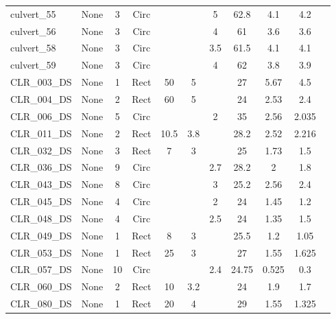 \begin{table}[]
\begin{tabular}{@{}lcccccccccc@{}}
culvert\_55   & None       & 3        & Circ &        &       & 5        & 62.8   & 4.1       & 4.2        \\
culvert\_56   & None       & 3        & Circ &        &       & 4        & 61     & 3.6       & 3.6        \\
culvert\_58   & None       & 3        & Circ &        &       & 3.5      & 61.5   & 4.1       & 4.1        \\
culvert\_59   & None       & 3        & Circ &        &       & 4        & 62     & 3.8       & 3.9        \\
CLR\_003\_DS  & None       & 1        & Rect & 50     & 5     &          & 27     & 5.67      & 4.5        \\
CLR\_004\_DS  & None       & 2        & Rect & 60     & 5     &          & 24     & 2.53      & 2.4        \\
CLR\_006\_DS  & None       & 5        & Circ &        &       & 2        & 35     & 2.56      & 2.035      \\
CLR\_011\_DS  & None       & 2        & Rect & 10.5   & 3.8   &          & 28.2   & 2.52      & 2.216      \\
CLR\_032\_DS  & None       & 3        & Rect & 7      & 3     &          & 25     & 1.73      & 1.5        \\
CLR\_036\_DS  & None       & 9        & Circ &        &       & 2.7      & 28.2   & 2         & 1.8        \\
CLR\_043\_DS  & None       & 8        & Circ &        &       & 3        & 25.2   & 2.56      & 2.4        \\
CLR\_045\_DS  & None       & 4        & Circ &        &       & 2        & 24     & 1.45      & 1.2        \\
CLR\_048\_DS  & None       & 4        & Circ &        &       & 2.5      & 24     & 1.35      & 1.5        \\
CLR\_049\_DS  & None       & 1        & Rect & 8      & 3     &          & 25.5   & 1.2       & 1.05       \\
CLR\_053\_DS  & None       & 1        & Rect & 25     & 3     &          & 27     & 1.55      & 1.625      \\
CLR\_057\_DS  & None       & 10       & Circ &        &       & 2.4      & 24.75  & 0.525     & 0.3        \\
CLR\_060\_DS  & None       & 2        & Rect & 10     & 3.2   &          & 24     & 1.9       & 1.7        \\
CLR\_080\_DS  & None       & 1        & Rect & 20     & 4     &          & 29     & 1.55      & 1.325      \\

\end{tabular}
\end{table}
